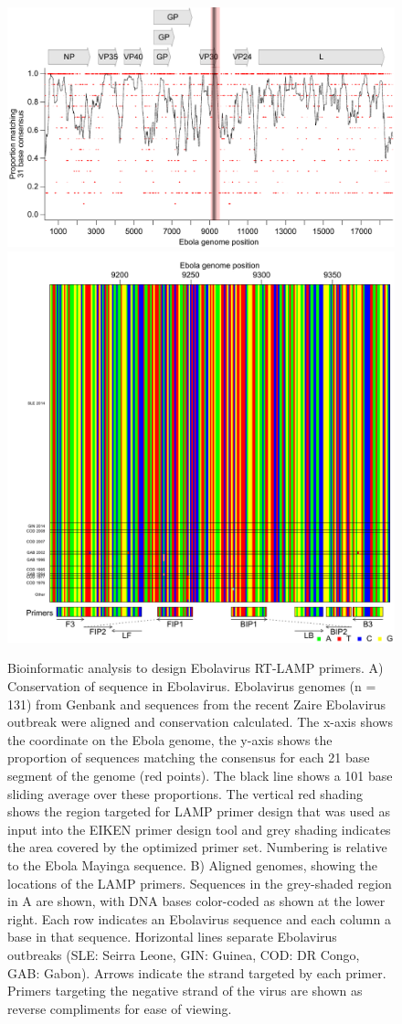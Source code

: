 \documentclass[../sherrill-Mix_thesis.tex]{subfiles}
\begin{document}
	\begin{figure}
		\centering
		\includegraphics[width=.6\textwidth]{ebolaConsensus.pdf} %
		\includegraphics[width=.6\textwidth]{loop_bases.pdf} %
		\caption[Ebola RT-LAMP primers design]{Bioinformatic analysis to design Ebolavirus RT-LAMP primers. A) Conservation of sequence in Ebolavirus. Ebolavirus genomes (n = 131) from Genbank and sequences from the recent Zaire Ebolavirus outbreak \citep{Gire2014} were aligned and conservation calculated. The x-axis shows the coordinate on the Ebola genome, the y-axis shows the proportion of sequences matching the consensus for each 21 base segment of the genome (red points). The black line shows a 101 base sliding average over these proportions. The vertical red shading shows the region targeted for LAMP primer design that was used as input into the EIKEN primer design tool and grey shading indicates the area covered by the optimized primer set. Numbering is relative to the Ebola Mayinga sequence. B) Aligned genomes, showing the locations of the LAMP primers. Sequences in the grey-shaded region in A are shown, with DNA bases color-coded as shown at the lower right. Each row indicates an Ebolavirus sequence and each column a base in that sequence. Horizontal lines separate Ebolavirus outbreaks (SLE: Seirra Leone, GIN: Guinea, COD: DR Congo, GAB: Gabon). Arrows indicate the strand targeted by each primer. Primers targeting the negative strand of the virus are shown as reverse compliments for ease of viewing.}
		\label{figEbolaConsensus}
	\end{figure}
\end{document}
